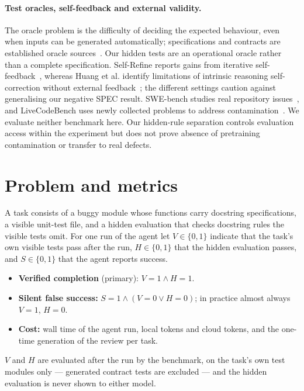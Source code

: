 \documentclass[11pt]{article}
\begin{document}
\paragraph{Test oracles, self-feedback and external validity.} The oracle problem is the difficulty of deciding the expected behaviour, even when inputs can be generated automatically; specifications and contracts are established oracle sources~\citep{barr2015oracle}. Our hidden tests are an operational oracle rather than a complete specification. Self-Refine reports gains from iterative self-feedback~\citep{madaan2023selfrefine}, whereas Huang et al. identify limitations of intrinsic reasoning self-correction without external feedback~\citep{huang2024selfcorrect}; the different settings caution against generalising our negative SPEC result. SWE-bench studies real repository issues~\citep{jimenez2024swebench}, and LiveCodeBench uses newly collected problems to address contamination~\citep{jain2024livecodebench}. We evaluate neither benchmark here. Our hidden-rule separation controls evaluation access within the experiment but does not prove absence of pretraining contamination or transfer to real defects.

\section{Problem and metrics}\label{sec:problem}
A task consists of a buggy module whose functions carry docstring specifications, a visible unit-test file, and a hidden evaluation that checks docstring rules the visible tests omit. For one run of the agent let $V\in\{0,1\}$ indicate that the task's own visible tests pass after the run, $H\in\{0,1\}$ that the hidden evaluation passes, and $S\in\{0,1\}$ that the agent reports success.
\begin{itemize}
\item \textbf{Verified completion} (primary): $V=1\land H=1$.
\item \textbf{Silent false success:} $S=1\land(V=0\lor H=0)$; in practice almost always $V=1$, $H=0$.
\item \textbf{Cost:} wall time of the agent run, local tokens and cloud tokens, and the one-time generation of the review per task.
\end{itemize}
$V$ and $H$ are evaluated after the run by the benchmark, on the task's own test modules only --- generated contract tests are excluded --- and the hidden evaluation is never shown to either model.
\end{document}
